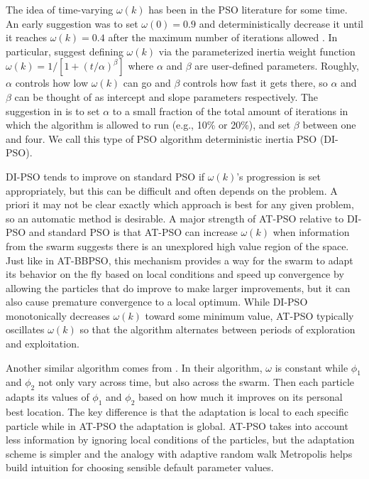 \documentclass[cmbright]{staauth}
\begin{document}
The idea of time-varying $\omega(k)$ has been in the PSO literature for some time. An early suggestion was to set $\omega(0)=0.9$ and deterministically decrease it until it reaches $\omega(k)=0.4$ after the maximum number of iterations allowed \citep{eberhart2000comparing}. In particular, \citet{tuppadung2011comparing} suggest defining $\omega(k)$ via the parameterized inertia weight function $\omega(k) = 1/\left[1 + (t/\alpha)^{\beta}\right]$ where $\alpha$ and $\beta$ are user-defined parameters. Roughly, $\alpha$ controls how low $\omega(k)$ can go and $\beta$ controls how fast it gets there, so $\alpha$ and $\beta$ can be thought of as intercept and slope parameters respectively. The suggestion in \citet{tuppadung2011comparing} is to set $\alpha$ to a small fraction of the total amount of iterations in which the algorithm is allowed to run (e.g., 10\% or 20\%), and set $\beta$ between one and four. We call this type of PSO algorithm deterministic inertia PSO (DI-PSO).

DI-PSO tends to improve on standard PSO if $\omega(k)$'s progression is set appropriately, but this can be difficult and often depends on the problem. A priori it may not be clear exactly which approach is best for any given problem, so an automatic method is desirable. A major strength of AT-PSO relative to DI-PSO and standard PSO is that AT-PSO can increase $\omega(k)$ when information from the swarm suggests there is an unexplored high value region of the space. Just like in AT-BBPSO, this mechanism provides a way for the swarm to adapt its behavior on the fly based on local conditions and speed up convergence by allowing the particles that do improve to make larger improvements, but it can also cause premature convergence to a local optimum. While DI-PSO monotonically decreases $\omega(k)$ toward some minimum value, AT-PSO typically oscillates $\omega(k)$ so that the algorithm alternates between periods of exploration and exploitation.

Another similar algorithm comes from \citet{zhang2003adaptive}. In their algorithm, $\omega$ is constant while $\phi_1$ and $\phi_2$ not only vary across time, but also across the swarm. Then each particle adapts its values of $\phi_1$ and $\phi_2$ based on how much it improves on its personal best location. The key difference is that the adaptation is local to each specific particle while in AT-PSO the adaptation is global. AT-PSO takes into account less information by ignoring local conditions of the particles, but the adaptation scheme is simpler and the analogy with adaptive random walk Metropolis helps build intuition for choosing sensible default parameter values.
\end{document}
